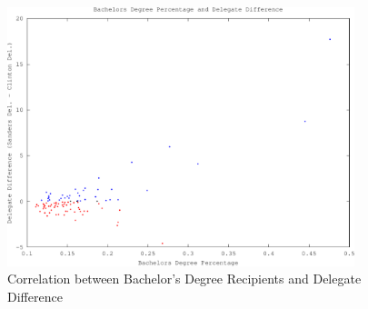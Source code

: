 \documentclass[11pt]{article}
\begin{document}
\begin{figure}[H]
    \caption{Correlation between Bachelor's Degree Recipients and Delegate Difference}
    \centering
    \includegraphics[width=0.9\textwidth]{iowa-corr-bach-crop}
\end{figure}
\end{document}
